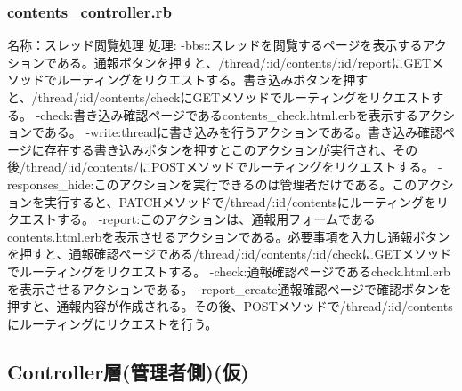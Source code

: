 \documentclass[a4j]{jarticle}
\begin{document}
\subsubsection{contents\_controller.rb}
\noindent 名称：スレッド閲覧処理 \newline
処理:\newline
-bbs::スレッドを閲覧するページを表示するアクションである。通報ボタンを押すと、/thread/:id/contents/:id/reportにGETメソッドでルーティングをリクエストする。書き込みボタンを押すと、/thread/:id/contents/checkにGETメソッドでルーティングをリクエストする。\newline
-check:書き込み確認ページであるcontents\_check.html.erbを表示するアクションである。\newline
-write:threadに書き込みを行うアクションである。書き込み確認ページに存在する書き込みボタンを押すとこのアクションが実行され、その後/thread/:id/contents/にPOSTメソッドでルーティングをリクエストする。\newline
-responses\_hide:このアクションを実行できるのは管理者だけである。このアクションを実行すると、PATCHメソッドで/thread/:id/contentsにルーティングをリクエストする。\newline
-report:このアクションは、通報用フォームであるcontents.html.erbを表示させるアクションである。必要事項を入力し通報ボタンを押すと、通報確認ページである/thread/:id/contents/:id/checkにGETメソッドでルーティングをリクエストする。\newline
-check:通報確認ページであるcheck.html.erbを表示させるアクションである。\newline
-report\_create通報確認ページで確認ボタンを押すと、通報内容が作成される。その後、POSTメソッドで/thread/:id/contentsにルーティングにリクエストを行う。



\subsection{Controller層(管理者側)(仮)}
\end{document}
